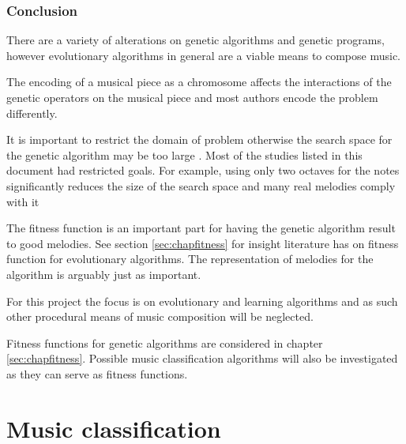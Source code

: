 \subsection{Conclusion}
There are a variety of alterations on genetic algorithms and genetic programs, however evolutionary algorithms in general are a viable means to compose music.

The encoding of a musical piece as a chromosome affects the interactions of the genetic operators on the musical piece and most authors encode the problem differently.

It is important to restrict the domain of problem otherwise the search space for the genetic algorithm may be too large \cite{Jacob1995}. Most of the studies listed in this document had restricted goals.
For example, using only two octaves for the notes significantly reduces the size of the search space and many real melodies comply with it \cite{Alfonseca2007}

The fitness function is an important part for having the genetic algorithm result to good melodies. See section \ref{sec:chapfitness} for insight literature has on fitness function for evolutionary algorithms.
The representation of melodies for the algorithm is arguably just as important.

For this project the focus is on evolutionary and learning algorithms and as such other procedural means of music composition will be neglected. 

Fitness functions for genetic algorithms are considered in chapter \ref{sec:chapfitness}. Possible music classification algorithms will also be investigated as they can serve as fitness functions.



\chapter{Music classification} \label{sec:music_class}
